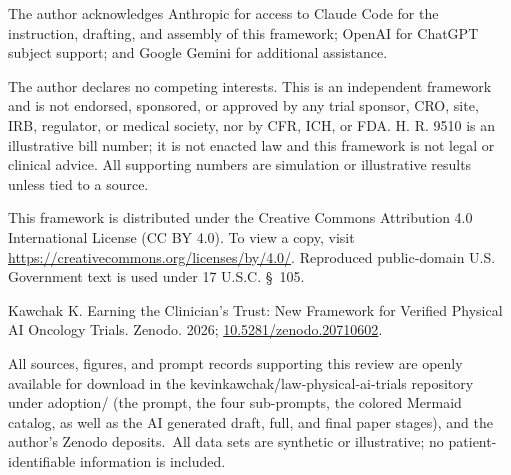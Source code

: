 
\clearpage

The author acknowledges Anthropic for access to Claude Code for the instruction,
drafting, and assembly of this framework; OpenAI for ChatGPT subject support; and
Google Gemini for additional assistance.

The author declares no competing interests. This is an independent framework and is
not endorsed, sponsored, or approved by any trial sponsor, CRO, site, IRB,
regulator, or medical society, nor by CFR, ICH, or FDA. H. R. 9510 is an
illustrative bill number; it is not enacted law and this framework is not legal or
clinical advice. All supporting numbers are simulation or illustrative results
unless tied to a source.

This framework is distributed under the Creative Commons Attribution 4.0
International License (CC BY 4.0). To view a copy, visit
\url{https://creativecommons.org/licenses/by/4.0/}. Reproduced public-domain U.S.
Government text is used under 17 U.S.C. \S~105.

Kawchak K. Earning the Clinician's Trust: New Framework for Verified Physical AI Oncology Trials. Zenodo. 2026;
\href{https://doi.org/10.5281/zenodo.20710602}{10.5281/zenodo.20710602}.

All sources, figures, and prompt records supporting this review are openly
available for download in the kevinkawchak/law-physical-ai-trials repository under adoption/ (the prompt, the four sub-prompts, the colored Mermaid catalog,
as well as the AI generated draft, full, and final paper stages), and the author's Zenodo deposits.\ All data sets are synthetic or illustrative; no patient-identifiable information is included.

